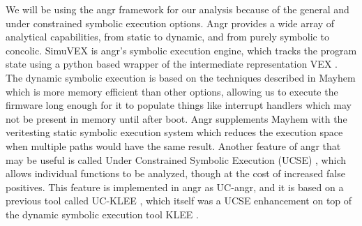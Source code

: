 \documentclass[letterpaper, 10 pt, conference]{ieeeconf}
\begin{document}
We will be using the angr framework \cite{angr} for our analysis because of the general and under constrained symbolic execution options. Angr provides a wide array of analytical capabilities, from static to dynamic, and from purely symbolic to concolic. SimuVEX is angr’s symbolic execution engine, which tracks the program state using a python based wrapper \cite{pyvex} of the intermediate representation VEX \cite{vex}. The dynamic symbolic execution is based on the techniques described in Mayhem \cite{mayhem} which is more memory efficient than other options, allowing us to execute the firmware long enough for it to populate things like interrupt handlers which may not be present in memory until after boot. Angr supplements Mayhem with the veritesting static symbolic execution system \cite{veritesting} which reduces the execution space when multiple paths would have the same result. Another feature of angr that may be useful is called Under Constrained Symbolic Execution (UCSE) \cite{ucklee2}, which allows individual functions to be analyzed, though at the cost of increased false positives. This feature is implemented in angr as UC-angr, and it is based on a previous tool called UC-KLEE \cite{ucklee1}, which itself was a UCSE enhancement on top of the dynamic symbolic execution tool KLEE \cite{klee}.

{}

\end{document}
